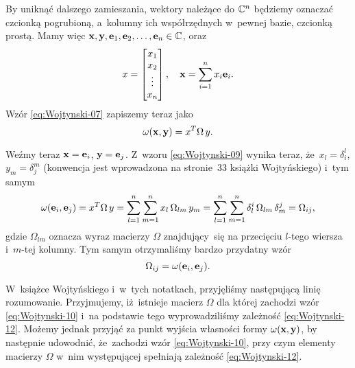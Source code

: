 \documentclass[a4paper,11pt]{article}
\begin{document}
By uniknąć dalszego zamieszania, wektory należące do
$\mathbb{C}^{ n }$ będziemy oznaczać czcionką pogrubioną, a~kolumny ich
współrzędnych w~pewnej bazie, czcionką prostą. Mamy więc
$\mathbf{x}, \mathbf{y}, \mathbf{e}_{ 1 }, \mathbf{e}_{ 2 }, \ldots, \mathbf{e}_{ n }
\in \mathbb{C}$, oraz
\begin{equation}
  \label{eq:Wojtynski-09}
  x =
  \begin{bmatrix}
    x_{ 1 } \\
    x_{ 2 } \\
    \vdots \\
    x_{ n }
  \end{bmatrix}, \quad
  \mathbf{x} = \sum_{ i = 1 }^{ n } x_{ i } \mathbf{e}_{ i }.
\end{equation}
Wzór \eqref{eq:Wojtynski-07} zapiszemy teraz jako
\begin{equation}
  \label{eq:Wojtynski-10}
  \omega( \mathbf{x}, \mathbf{y} ) = x^{ T } \Omega \, y.
\end{equation}

Weźmy teraz $\mathbf{x} = \mathbf{e}_{ i }$, $\mathbf{y} = \mathbf{e}_{ j }$.
Z~wzoru \eqref{eq:Wojtynski-09} wynika teraz, że~$x_{ l } = \delta^{ l }_{ i }$,
$y_{ m } = \delta^{ m }_{ j }$ (konwencja jest wprowadzona na stronie~33 książki
Wojtyńskiego) i~tym samym
\begin{equation}
  \label{eq:Wojtynski-11}
  \omega( \mathbf{e}_{ i }, \mathbf{e}_{ j } ) = x^{ T } \Omega \, y =
  \sum_{ l = 1 }^{ n } \sum_{ m = 1 }^{ n } x_{ l } \, \Omega_{ l m } \, y_{ m } =
  \sum_{ l = 1 }^{ n } \sum_{ m = 1 }^{ n } \delta^{ i }_{ l } \, \Omega_{ l m } \, \delta^{ j }_{ m } =
  \Omega_{ i j },
\end{equation}
gdzie $\Omega_{ l m }$ oznacza wyraz macierzy $\Omega$ znajdujący~się na przecięciu
$l$-tego wiersza i~$m$-tej kolumny. Tym samym otrzymaliśmy bardzo przydatny
wzór
\begin{equation}
  \label{eq:Wojtynski-12}
  \Omega_{ i j } = \omega( \mathbf{e}_{ i }, \mathbf{e}_{ j } ).
\end{equation}

W~książce Wojtyńskiego i~w~tych notatkach, przyjęliśmy następującą linię
rozumowanie. Przyjmujemy, iż~istnieje macierz $\Omega$ dla której zachodzi wzór
\eqref{eq:Wojtynski-10} i~na podstawie tego wyprowadziliśmy zależność
\eqref{eq:Wojtynski-12}. Możemy jednak przyjąć za punkt wyjścia własności
formy $\omega( \mathbf{x}, \mathbf{y} )$, by następnie udowodnić, że~zachodzi wzór
\eqref{eq:Wojtynski-10}, przy czym elementy macierzy $\Omega$ w~nim występującej
spełniają zależność \eqref{eq:Wojtynski-12}.
\end{document}

